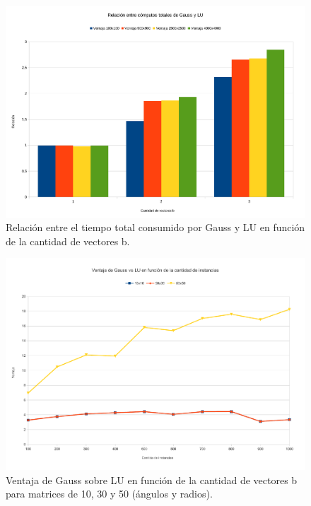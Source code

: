 \begin{figure}[H]{}
\centering
\includegraphics[scale=0.5]{graphs/ventRA.pdf}
\caption{Relación entre el tiempo total consumido por Gauss y LU en función de la cantidad de vectores b.}
\label{gaussVsLU5}
\end{figure}

\begin{figure}[H]{}
\centering
\includegraphics[scale=0.5]{graphs/gaussVsLU4.pdf}
\caption{Ventaja de Gauss sobre LU en función de la cantidad de vectores b para matrices de 10, 30 y 50 (ángulos y radios).}
\label{gaussVsLU6}
\end{figure}
